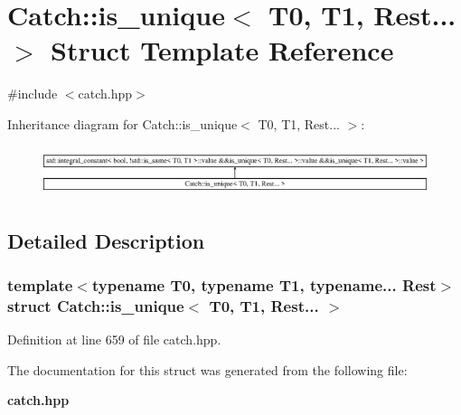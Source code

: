\section{Catch\+::is\+\_\+unique$<$ T0, T1, Rest... $>$ Struct Template Reference}
\label{struct_catch_1_1is__unique_3_01_t0_00_01_t1_00_01_rest_8_8_8_01_4}


{\ttfamily \#include $<$catch.\+hpp$>$}

Inheritance diagram for Catch\+::is\+\_\+unique$<$ T0, T1, Rest... $>$\+:\begin{figure}[H]
\begin{center}
\leavevmode
\includegraphics[height=1.483444cm]{struct_catch_1_1is__unique_3_01_t0_00_01_t1_00_01_rest_8_8_8_01_4}
\end{center}
\end{figure}


\subsection{Detailed Description}
\subsubsection*{template$<$typename T0, typename T1, typename... Rest$>$\newline
struct Catch\+::is\+\_\+unique$<$ T0, T1, Rest... $>$}



Definition at line 659 of file catch.\+hpp.



The documentation for this struct was generated from the following file\+:\begin{DoxyCompactItemize}
\item 
\textbf{ catch.\+hpp}\end{DoxyCompactItemize}

